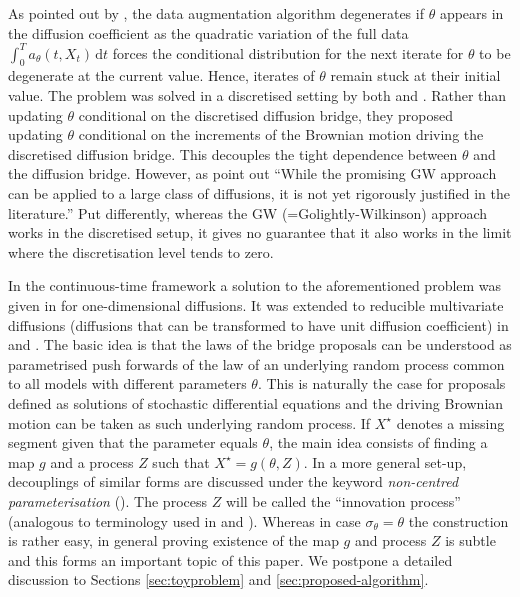 \documentclass[preprint]{imsart}
\newcommand{\si}{\sigma}
\renewcommand{\th}{\theta}
\theoremstyle{definition}
\newcommand{\dd}{{\,\mathrm d}}
\begin{document}
  As pointed out by \cite{RobertsStramer}, the data augmentation algorithm degenerates if $\th$ appears in the diffusion coefficient as the quadratic variation of the full data $\int_0^T a_\th(t,X_t) \dd t$  forces  the conditional distribution for the next iterate for $\th$ to be degenerate at the current value.  Hence,   iterates of $\th$ remain stuck at their initial value. 
The problem was solved in a discretised setting by both \cite{ChibPittShephard} and \cite{GolightlyWilkinsonChapter}. Rather than updating $\th$ conditional on the discretised diffusion bridge, they proposed  updating $\th$ conditional on the increments of the Brownian motion driving the discretised diffusion bridge.  This decouples the tight dependence between $\th$ and the diffusion bridge. However, as \cite{StramerBognar} point out ``While the promising GW approach can be applied to a large class of diffusions, it is not yet rigorously justified in the literature.'' Put differently, whereas the GW (=Golightly-Wilkinson) approach works in the discretised setup, it gives no guarantee that it also works in the limit where the discretisation level tends to zero. 

 In the continuous-time framework  a solution to the aforementioned problem was given in  \cite{RobertsStramer}  for one-dimensional diffusions. It was extended to reducible multivariate diffusions (diffusions that can be transformed to have unit diffusion coefficient) in \cite{BeskosPapaspiliopoulosRobertsFearnhead} and \cite{Sermaidis}. The basic idea is that  the laws of the bridge proposals can be understood as parametrised push forwards of the law of an underlying random process common to all models with different parameters $\th$. This is naturally the case for proposals defined as solutions of stochastic differential equations and the driving Brownian motion can be taken as such underlying random process.  If $X^\star$ denotes a missing segment given that the parameter equals $\th$, the main idea consists of finding a map $g$ and a process $Z$ such that $X^\star=g(\th, Z)$.  In a more general set-up, decouplings of similar forms are discussed under the keyword \emph{non-centred parameterisation} (\cite{PapasRobertsSkoeld}).  The process $Z$ will be called the ``innovation process'' (analogous to terminology used in  \cite{ChibPittShephard} and \cite{GolightlyWilkinsonChapter}).  
Whereas in case $\si_\th=\th$ the construction is rather easy, in general proving existence  of the map $g$ and process $Z$  is subtle and this forms an important topic of this paper. We postpone a detailed discussion to Sections \ref{sec:toyproblem}  and \ref{sec:proposed-algorithm}. 
\end{document}
